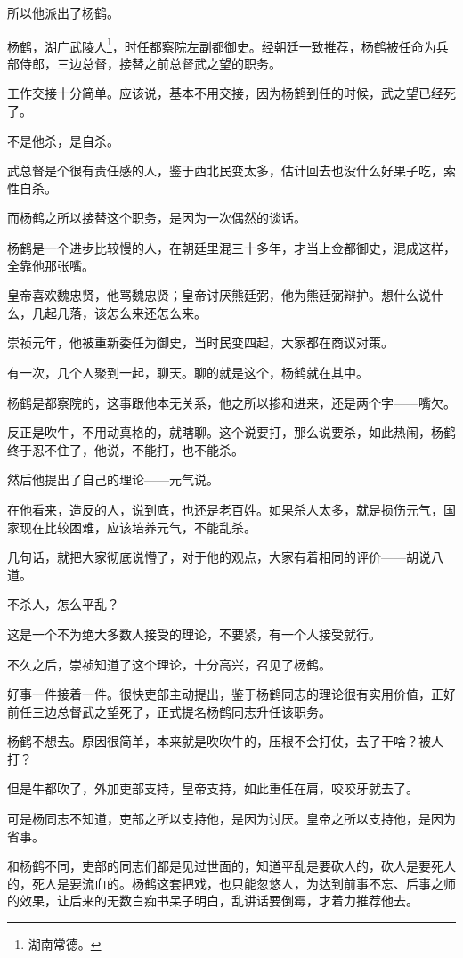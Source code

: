 \begin{multicols}{\theparacolNo}
所以他派出了杨鹤。

杨鹤，湖广武陵人\footnote{湖南常德。}，时任都察院左副都御史。经朝廷一致推荐，杨鹤被任命为兵部侍郎，三边总督，接替之前总督武之望的职务。

工作交接十分简单。应该说，基本不用交接，因为杨鹤到任的时候，武之望已经死了。

不是他杀，是自杀。

武总督是个很有责任感的人，鉴于西北民变太多，估计回去也没什么好果子吃，索性自杀。

而杨鹤之所以接替这个职务，是因为一次偶然的谈话。

杨鹤是一个进步比较慢的人，在朝廷里混三十多年，才当上佥都御史，混成这样，全靠他那张嘴。

皇帝喜欢魏忠贤，他骂魏忠贤；皇帝讨厌熊廷弼，他为熊廷弼辩护。想什么说什么，几起几落，该怎么来还怎么来。

崇祯元年，他被重新委任为御史，当时民变四起，大家都在商议对策。

有一次，几个人聚到一起，聊天。聊的就是这个，杨鹤就在其中。

杨鹤是都察院的，这事跟他本无关系，他之所以掺和进来，还是两个字——嘴欠。

反正是吹牛，不用动真格的，就瞎聊。这个说要打，那么说要杀，如此热闹，杨鹤终于忍不住了，他说，不能打，也不能杀。

然后他提出了自己的理论——元气说。

在他看来，造反的人，说到底，也还是老百姓。如果杀人太多，就是损伤元气，国家现在比较困难，应该培养元气，不能乱杀。

几句话，就把大家彻底说懵了，对于他的观点，大家有着相同的评价——胡说八道。

不杀人，怎么平乱？

这是一个不为绝大多数人接受的理论，不要紧，有一个人接受就行。

不久之后，崇祯知道了这个理论，十分高兴，召见了杨鹤。

好事一件接着一件。很快吏部主动提出，鉴于杨鹤同志的理论很有实用价值，正好前任三边总督武之望死了，正式提名杨鹤同志升任该职务。

杨鹤不想去。原因很简单，本来就是吹吹牛的，压根不会打仗，去了干啥？被人打？

但是牛都吹了，外加吏部支持，皇帝支持，如此重任在肩，咬咬牙就去了。

可是杨同志不知道，吏部之所以支持他，是因为讨厌。皇帝之所以支持他，是因为省事。

和杨鹤不同，吏部的同志们都是见过世面的，知道平乱是要砍人的，砍人是要死人的，死人是要流血的。杨鹤这套把戏，也只能忽悠人，为达到前事不忘、后事之师的效果，让后来的无数白痴书呆子明白，乱讲话要倒霉，才着力推荐他去。


\end{multicols}
